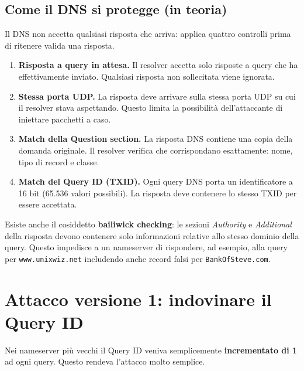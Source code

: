 \documentclass{article}
\begin{document}
\subsection*{Come il DNS si protegge (in teoria)}

Il DNS non accetta qualsiasi risposta che arriva: applica quattro controlli
prima di ritenere valida una risposta.

\begin{enumerate}[label=\textbf{\arabic*.}]
    \item \textbf{Risposta a query in attesa.} Il resolver accetta solo
        risposte a query che ha effettivamente inviato. Qualsiasi risposta
        non sollecitata viene ignorata.

    \item \textbf{Stessa porta UDP.} La risposta deve arrivare sulla stessa
        porta UDP su cui il resolver stava aspettando. Questo limita la
        possibilità dell'attaccante di iniettare pacchetti a caso.

    \item \textbf{Match della Question section.} La risposta DNS contiene
        una copia della domanda originale. Il resolver verifica che
        corrispondano esattamente: nome, tipo di record e classe.

    \item \textbf{Match del Query ID (TXID).} Ogni query DNS porta un
        identificatore a 16 bit (65.536 valori possibili). La risposta deve
        contenere lo stesso TXID per essere accettata.
\end{enumerate}

Esiste anche il cosiddetto \textbf{bailiwick checking}: le sezioni
\emph{Authority} e \emph{Additional} della risposta devono contenere solo
informazioni relative allo stesso dominio della query. Questo impedisce a un
nameserver di rispondere, ad esempio, alla query per \texttt{www.unixwiz.net}
includendo anche record falsi per \texttt{BankOfSteve.com}.

\section*{Attacco versione 1: indovinare il Query ID}

Nei nameserver più vecchi il Query ID veniva semplicemente
\textbf{incrementato di 1} ad ogni query. Questo rendeva l'attacco molto
semplice.
\end{document}
